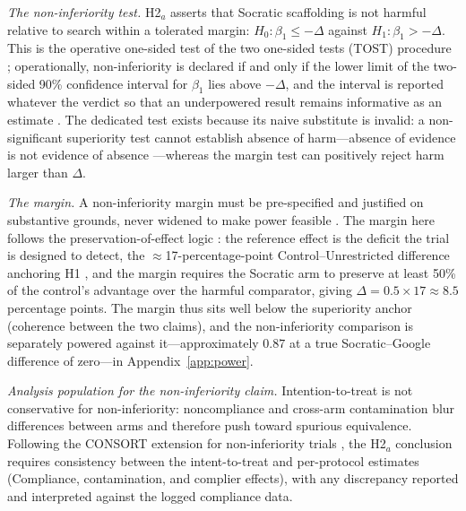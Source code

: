 \emph{The non-inferiority test.} H2$_a$ asserts that Socratic scaffolding is not harmful relative to search within a tolerated margin: $H_0\colon \beta_1 \le -\Delta$ against $H_1\colon \beta_1 > -\Delta$. This is the operative one-sided test of the two one-sided tests (TOST) procedure \parencite{schuirmann1987,lakens2017,lakens2018}; %
operationally, non-inferiority is declared if and only if the lower limit of the two-sided 90\% confidence interval for $\beta_1$ lies above $-\Delta$, and the interval is reported whatever the verdict so that an underpowered result remains informative as an estimate \parencite{cumming2014,amrhein2019}. The dedicated test exists because its naive substitute is invalid: a non-significant superiority test cannot establish absence of harm---absence of evidence is not evidence of absence \parencite{altmanbland1995}---whereas the margin test can positively reject harm larger than $\Delta$.

\emph{The margin.} A non-inferiority margin must be pre-specified and justified on substantive grounds, never widened to make power feasible \parencite{piaggio2012,ema2005,althunian2017}. The margin here follows the preservation-of-effect logic \parencite{althunian2017,dagostino2003}: the reference effect is the deficit the trial is designed to detect, the $\approx$17-percentage-point Control--Unrestricted difference anchoring H1 \parencite{shen2026}, and the margin requires the Socratic arm to preserve at least 50\% of the control's advantage over the harmful comparator, giving $\Delta = 0.5 \times 17 \approx 8.5$ percentage points. The margin thus sits well below the superiority anchor (coherence between the two claims), and the non-inferiority comparison is separately powered against it---approximately $0.87$ at a true Socratic--Google difference of zero---in Appendix~\ref{app:power}. %

\emph{Analysis population for the non-inferiority claim.} Intention-to-treat is not conservative for non-inferiority: noncompliance and cross-arm contamination blur differences between arms and therefore push toward spurious equivalence. Following the CONSORT extension for non-inferiority trials \parencite{piaggio2012}, the H2$_a$ conclusion requires consistency between the intent-to-treat and per-protocol estimates (Compliance, contamination, and complier effects), with any discrepancy reported and interpreted against the logged compliance data.

